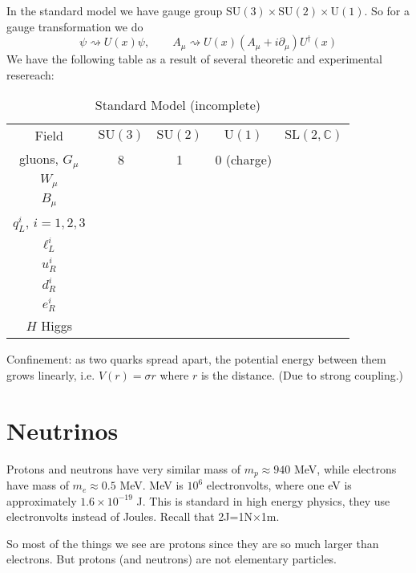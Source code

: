In the standard model we have gauge group
$\text{SU}(3)\times\text{SU}(2)\times\text{U}(1)$. So for a gauge transformation
we do
$$
\psi\rightsquigarrow U(x)\psi,\qquad 
A_\mu\rightsquigarrow U(x)(A_\mu+i\partial_\mu)U^\dag(x)
$$
We have the following table as a result of several theoretic and experimental
resereach:
\begin{table}[H]
\centering
\caption{Standard Model (incomplete)}
\label{tab:standard-model}
\begin{tabular}{c c c c c}
Field &	$\text{SU}(3)$ & $\text{SU}(2)$ & $\text{U}(1)$ &
$\text{SL}(2,\mathbb{C})$ \\
gluons, $G_\mu$ & 8 & 1 & 0 (charge) & \\
$W_\mu$ & & & & &\\
$B_\mu$ &&&&\\
\hline
$q^i_L$, $i=1,2,3$ &&&&\\
$\ell^i_L$ &&&&\\
$u^i_R$ &&&&\\
$d^i_R$ &&&&\\
$e^i_R$ &&&&\\
\hline
$H$ Higgs &&&&
\end{tabular}
\end{table}

Confinement: as two quarks spread apart, the potential energy between them grows
linearly, i.e. $V(r)=\sigma r$ where $r$ is the distance. (Due to strong
coupling.)

\section{Neutrinos}
\label{section-neutrinos}


Protons and neutrons have very similar mass of $m_p\approx940$ MeV, while
electrons have mass of $m_e \approx 0.5$ MeV. MeV is $10^{6}$ electronvolts,
where one eV is approximately $1.6\times 10^{-19}$ J. This is standard in high
energy physics, they use electronvolts instead of Joules. Recall that
2J=1N$\times$1m.

So most of the things we see are protons since they are so much larger than
electrons. But protons (and neutrons) are not elementary particles.

